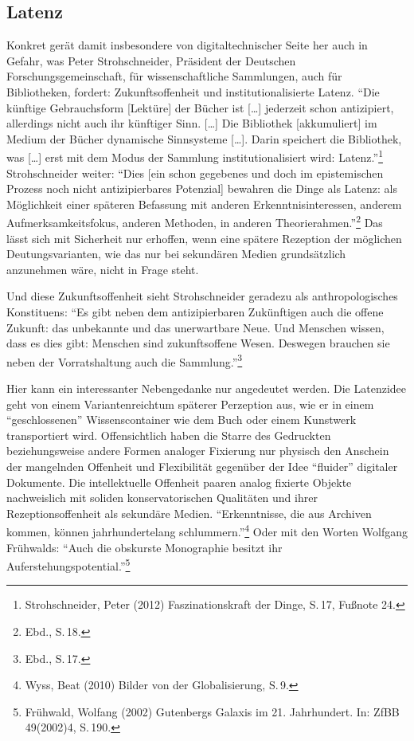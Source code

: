 \documentclass[a4paper,
fontsize=11pt,
oneside,
numbers=noperiodatend,
parskip=half-,
bibliography=totoc,
final
]{scrartcl}
\begin{document}
\subsection*{Latenz}\label{latenz}

Konkret gerät damit insbesondere von digitaltechnischer Seite her auch
in Gefahr, was Peter Strohschneider, Präsident der Deutschen
Forschungsgemeinschaft, für wissenschaftliche Sammlungen, auch für
Bibliotheken, fordert: Zukunftsoffenheit und institutionalisierte
Latenz. \enquote{Die künftige Gebrauchsform {[}Lektüre{]} der Bücher ist
{[}\ldots{}{]} jederzeit schon antizipiert, allerdings nicht auch ihr
künftiger Sinn. {[}\ldots{}{]} Die Bibliothek {[}akkumuliert{]} im
Medium der Bücher dynamische Sinnsysteme {[}\ldots{}{]}. Darin speichert
die Bibliothek, was {[}\ldots{}{]} erst mit dem Modus der Sammlung
institutionalisiert wird: Latenz.}\footnote{Strohschneider, Peter (2012)
  Faszinationskraft der Dinge, S.\,17, Fußnote 24.} Strohschneider
weiter: \enquote{Dies {[}ein schon gegebenes und doch im epistemischen
Prozess noch nicht antizipierbares Potenzial{]} bewahren die Dinge als
Latenz: als Möglichkeit einer späteren Befassung mit anderen
Erkenntnisinteressen, anderem Aufmerksamkeitsfokus, anderen Methoden, in
anderen Theorierahmen.}\footnote{Ebd., S.\,18.} Das lässt sich mit
Sicherheit nur erhoffen, wenn eine spätere Rezeption der möglichen
Deutungsvarianten, wie das nur bei sekundären Medien grundsätzlich
anzunehmen wäre, nicht in Frage steht.

Und diese Zukunftsoffenheit sieht Strohschneider geradezu als
anthropologisches Konstituens: \enquote{Es gibt neben dem
antizipierbaren Zukünftigen auch die offene Zukunft: das unbekannte und
das unerwartbare Neue. Und Menschen wissen, dass es dies gibt: Menschen
sind zukunftsoffene Wesen. Deswegen brauchen sie neben der
Vorratshaltung auch die Sammlung.}\footnote{Ebd., S.\,17.}

Hier kann ein interessanter Nebengedanke nur angedeutet werden. Die
Latenzidee geht von einem Variantenreichtum späterer Perzeption aus, wie
er in einem \enquote{geschlossenen} Wissenscontainer wie dem Buch oder
einem Kunstwerk transportiert wird. Offensichtlich haben die Starre des
Gedruckten beziehungsweise andere Formen analoger Fixierung nur physisch
den Anschein der mangelnden Offenheit und Flexibilität gegenüber der
Idee \enquote{fluider} digitaler Dokumente. Die intellektuelle Offenheit
paaren analog fixierte Objekte nachweislich mit soliden
konservatorischen Qualitäten und ihrer Rezeptionsoffenheit als sekundäre
Medien. \enquote{Erkenntnisse, die aus Archiven kommen, können
jahrhundertelang schlummern.}\footnote{Wyss, Beat (2010) Bilder von der
  Globalisierung, S.\,9.} Oder mit den Worten Wolfgang Frühwalds:
\enquote{Auch die obskurste Monographie besitzt ihr
Auferstehungspotential.}\footnote{Frühwald, Wolfang (2002) Gutenbergs
  Galaxis im 21. Jahrhundert. In: ZfBB 49(2002)4, S.\,190.}
\end{document}

